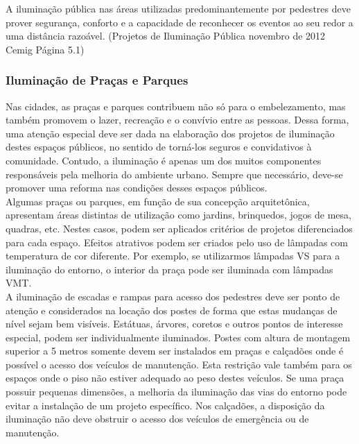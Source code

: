 A ilumina\c{c}\~ao p\'ublica nas \'areas utilizadas predominantemente por pedestres deve prover seguran\c{c}a, conforto e a capacidade de reconhecer os eventos ao seu redor a uma dist\^ancia razo\'avel. \cite{CopelParana}(Projetos de Ilumina\c{c}\~ao P\'ublica novembro de 2012 Cemig P\'agina 5.1)

\subsubsection{Ilumina\c{c}\~ao de Pra\c{c}as e Parques}

Nas cidades, as pra\c{c}as e parques contribuem n\~ao s\'o para o embelezamento, mas tamb\'em promovem o lazer, recrea\c{c}\~ao e o conv\'ivio entre as pessoas. Dessa forma, uma aten\c{c}\~ao especial deve ser dada na elabora\c{c}\~ao dos projetos de ilumina\c{c}\~ao destes espa\c{c}os p\'ublicos, no sentido de torn\'a-los seguros e convidativos \`a comunidade. Contudo, a ilumina\c{c}\~ao \'e apenas um dos muitos componentes respons\'aveis pela melhoria do ambiente urbano. Sempre que necess\'ario, deve-se promover uma reforma nas condi\c{c}\~oes desses espa\c{c}os p\'ublicos.\cite{CemigMinas} \\ Algumas pra\c{c}as ou parques, em fun\c{c}\~ao de sua concep\c{c}\~ao arquitet\^onica, apresentam \'areas distintas de utiliza\c{c}\~ao como jardins, brinquedos, jogos de mesa, quadras, etc. Nestes casos, podem ser aplicados crit\'erios de projetos diferenciados para cada espa\c{c}o. Efeitos atrativos podem ser criados pelo uso de l\^ampadas com temperatura de cor diferente. Por exemplo, se utilizarmos l\^ampadas VS para a ilumina\c{c}\~ao do entorno, o interior da pra\c{c}a pode ser iluminada com l\^ampadas VMT.\cite{CemigMinas} \\ A ilumina\c{c}\~ao de escadas e rampas para acesso dos pedestres deve ser ponto de aten\c{c}\~ao e considerados na loca\c{c}\~ao dos postes de forma que estas mudan\c{c}as de n\'ivel sejam bem vis\'iveis. Est\'atuas, \'arvores, coretos e outros pontos de interesse especial, podem ser individualmente iluminados. Postes com altura de montagem superior a 5 metros somente devem ser instalados em pra\c{c}as e cal\c{c}ad\~oes onde \'e poss\'ivel o acesso dos ve\'iculos de manuten\c{c}\~ao. Esta restri\c{c}\~ao vale tamb\'em para os espa\c{c}os onde o piso n\~ao estiver adequado ao peso destes ve\'iculos. Se uma pra\c{c}a possuir pequenas dimens\~oes, a melhoria da ilumina\c{c}\~ao das vias do entorno pode evitar a instala\c{c}\~ao de um projeto espec\'ifico. Nos cal\c{c}ad\~oes, a disposi\c{c}\~ao da ilumina\c{c}\~ao n\~ao deve obstruir o acesso dos ve\'iculos de emerg\^encia ou de manuten\c{c}\~ao.\cite{CemigMinas} 


